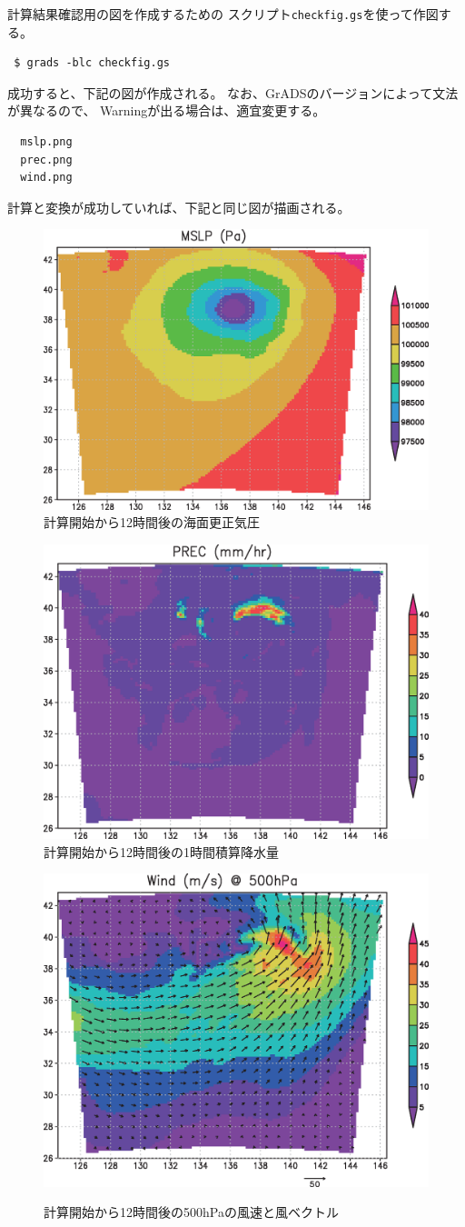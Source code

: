 計算結果確認用の図を作成するための
スクリプト\verb|checkfig.gs|を使って作図する。
\begin{verbatim}
 $ grads -blc checkfig.gs
\end{verbatim}
成功すると、下記の図が作成される。
なお、GrADSのバージョンによって文法が異なるので、
Warningが出る場合は、適宜変更する。
\begin{verbatim}
  mslp.png
  prec.png
  wind.png
\end{verbatim}
計算と変換が成功していれば、下記と同じ図が描画される。

\begin{figure}[h]
\begin{center}
  \includegraphics[width=0.55\hsize]{./figure/real_mslp.eps}\\
  \caption{計算開始から12時間後の海面更正気圧}
  \label{fig:real_mslp}
\end{center}
\begin{center}
  \includegraphics[width=0.55\hsize]{./figure/real_prec.eps}\\
  \caption{計算開始から12時間後の1時間積算降水量}
  \label{fig:real_prec}
\end{center}
\begin{center}
  \includegraphics[width=0.55\hsize]{./figure/real_wind.eps}\\
  \caption{計算開始から12時間後の500hPaの風速と風ベクトル}
  \label{fig:real_wind}
\end{center}
\end{figure}



